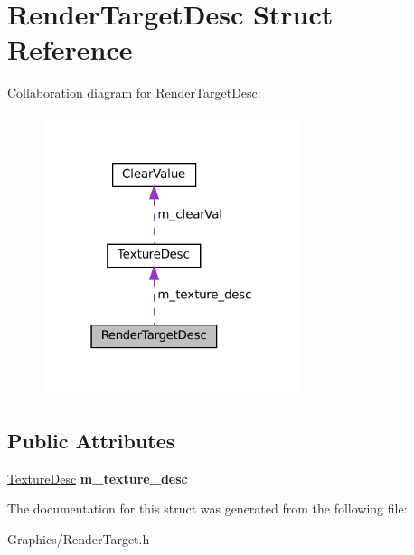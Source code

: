 \hypertarget{structRenderTargetDesc}{}\section{Render\+Target\+Desc Struct Reference}
\label{structRenderTargetDesc}


Collaboration diagram for Render\+Target\+Desc\+:
\nopagebreak
\begin{figure}[H]
\begin{center}
\leavevmode
\includegraphics[width=214pt]{structRenderTargetDesc__coll__graph}
\end{center}
\end{figure}
\subsection*{Public Attributes}
\begin{DoxyCompactItemize}
\item 
\mbox{\label{structRenderTargetDesc_af4da5794f1ac1b7376f29f89d3f46c9d}} 
\hyperlink{structTextureDesc}{Texture\+Desc} {\bfseries m\+\_\+texture\+\_\+desc}
\end{DoxyCompactItemize}


The documentation for this struct was generated from the following file\+:\begin{DoxyCompactItemize}
\item 
Graphics/Render\+Target.\+h\end{DoxyCompactItemize}
